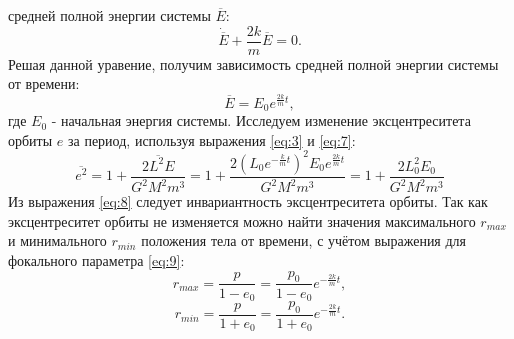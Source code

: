 \documentclass[12pt]{article}
\begin{document}
средней полной энергии системы $\overline{E}$:
\begin{equation}\label{eq:6}
    \dot{\overline{E}} + \frac{2k}{m}\overline{E} = 0.
\end{equation}
Решая данной уравение, получим зависимость средней полной энергии системы от времени:
\begin{equation}\label{eq:7}
    \overline{E} = E_0e^{\frac{2k}{m}t},
\end{equation}
где $E_0$ - начальная энергия системы.
Исследуем изменение эксцентреситета орбиты $e$ за период, используя выражения \ref{eq:3} и \ref{eq:7}:
\begin{equation}\label{eq:8}
    \overline{e^2} = 1 + \overline{\frac{2L^2E}{G^2M^2m^3}} = 1 + \frac{2(L_0e^{-\frac{k}{m}t})^2E_0e^{\frac{2k}{m}t}}{G^2M^2m^3} = 1 + \frac{2L_0^2E_0}{G^2M^2m^3}
\end{equation}
Из выражения \ref{eq:8} следует инвариантность эксцентреситета орбиты. Так как эксцентреситет орбиты не изменяется можно найти значения 
максимального $r_{max}$ и минимального $r_{min}$ положения тела от времени, с учётом выражения для фокального параметра \ref{eq:9}:
\begin{equation}\label{eq:10}
    r_{max} = \frac{p}{1 - e_0} = \frac{p_0}{1 - e_0}e^{-\frac{2k}{m}t},
\end{equation}
\begin{equation}\label{eq:11}
    r_{min} = \frac{p}{1 + e_0} = \frac{p_0}{1 + e_0}e^{-\frac{2k}{m}t}.
\end{equation}
\end{document}
